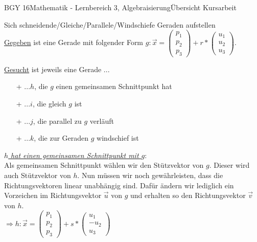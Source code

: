 \documentclass[oneside,openany,headings=optiontotoc,11pt,numbers=noenddot]{scrreprt}
\begin{document}
\begin{worksheet}{BGY 16}{Mathematik - Lernbereich 3, Algebraisierung}{Übersicht Kursarbeit}
\begin{framed}
			\noindent
			\tiny{\color{codegray}Sich schneidende/Gleiche/Parallele/Windschiefe Geraden aufstellen}\\\normalsize
			\underline{Gegeben} ist eine Gerade mit folgender Form \(g: \vec{x} = \left(\begin{array}{c}p_1\\p_2\\p_3\end{array}\right) + r*\left(\begin{array}{c}u_1\\u_2\\u_3\end{array}\right)\).\\
			\par\noindent
			\underline{Gesucht} ist jeweils eine Gerade ...
			\begin{itemize}
				\item[+] ...\(h\), die \(g\) \color{codegreen}einen\normalcolor{} gemeinsamen Schnittpunkt hat
				\item[+] ...\(i\), die \color{codegreen}gleich\normalcolor{} \(g\) ist
				\item[+] ...\(j\), die \color{red}parallel\normalcolor{} zu \(g\) verläuft
				\item[+] ...\(k\), die zur Geraden \(g\) \color{red}windschief\normalcolor{} ist
			\end{itemize}
			\par\bigskip\noindent
			\underline{\textit{\(h\) hat \color{codegreen}einen\normalcolor{} gemeinsamen Schnittpunkt mit \(g\)}}:\\
			Als gemeinsamen Schnittpunkt wählen wir den Stützvektor von \(g\). Dieser wird auch Stützvektor von \(h\). Nun müssen wir noch gewährleisten, dass die Richtungsvektoren linear \color{blue}unabhängig\normalcolor{} sind. Dafür ändern wir lediglich ein Vorzeichen im Richtungsvektor \(\vec{u}\) von \(g\) und erhalten so den Richtungsvektor \(\vec{v}\) von \(h\).\\
			\(\Rightarrow h: \vec{x} = \left(\begin{array}{c}p_1\\p_2\\p_3\end{array}\right) + s*\left(\begin{array}{c}u_1\\-u_2\\u_3\end{array}\right)\)\\
			\par\bigskip\noindent

\end{framed}
\end{worksheet}
\end{document}
